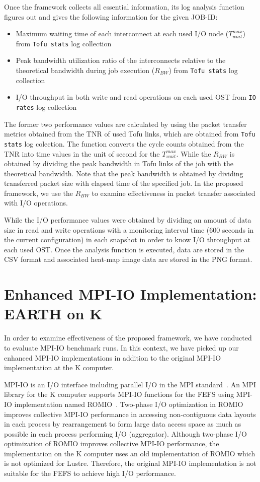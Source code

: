\documentclass{jhps}
\begin{document}
Once the framework collects all essential information, its log analysis function
figures out and gives the following information for the given JOB-ID:
\begin{itemize}
\item Maximum waiting time of each interconnect at each used I/O node ($T_{wait}^{max}$)
from {\tt Tofu stats} log collection
\item Peak bandwidth utilization ratio of the interconnects relative to
the theoretical bandwidth during job execution ($R_{BW}$)
from {\tt Tofu stats} log collection
\item I/O throughput in both write and read operations on each used OST
from {\tt IO rates} log collection
\end{itemize}
%
The former two performance values are calculated by using the packet transfer metrics
obtained from the TNR of used Tofu links, which are obtained from
{\tt Tofu stats} log colection.
The function converts the cycle counts obtained from the TNR
into time values in the unit of second for the $T_{wait}^{max}$.
While the $R_{BW}$ is obtained by dividing the peak bandwidth
in Tofu links of the job with the theoretical bandwidth.
Note that the peak bandwidth is obtained by dividing transferred packet size
with elapsed time of the specified job.
In the proposed framework, we use the $R_{BW}$
to examine effectiveness in packet transfer associated with I/O operations.

While the I/O performance values were obtained by dividing an amount of data size
in read and write operations with a monitoring interval time
(600 seconds in the current configuration) in each snapshot
in order to know I/O throughput at each used OST.
Once the analysis function is executed, data are stored in the CSV format
and associated heat-map image data are stored in the PNG format.

\section{Enhanced MPI-IO Implementation: EARTH on K}
\label{sec:EARTH}

In order to examine effectiveness of the proposed framework,
we have conducted to evaluate MPI-IO benchmark runs.
In this context, we have picked up our enhanced MPI-IO implementations
in addition to the original MPI-IO implementation at the K computer.

MPI-IO is an I/O interface including parallel I/O in the MPI standard~\cite{mpi-forum:web}.
An MPI library for the K computer supports MPI-IO functions for the FEFS
using MPI-IO implementation named ROMIO~\cite{thakur:romio}.
Two-phase I/O optimization in ROMIO
improves collective MPI-IO performance in accessing
non-contiguous data layouts in each process by rearrangement
to form large data access space as much as possible in each process
performing I/O (aggregator).
Although two-phase I/O optimization of ROMIO improves collective MPI-IO performance,
the implementation on the K computer uses an old implementation of ROMIO
which is not optimized for Lustre.
Therefore, the original MPI-IO implementation is not suitable
for the FEFS to achieve high I/O performance.
\end{document}
